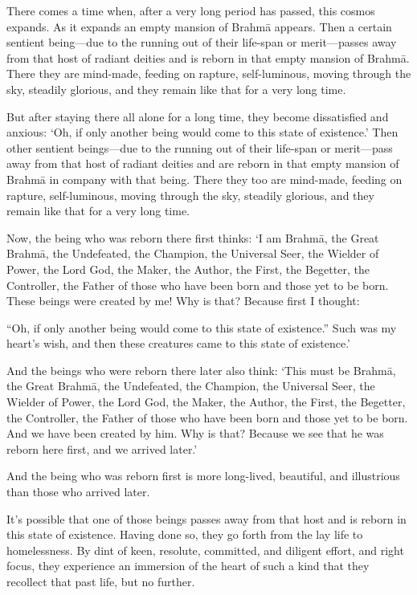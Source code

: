\documentclass[12pt,openany]{book}%
\begin{document}
There comes a time when, after a very long period has passed, this cosmos expands. As it expands an empty mansion of \textsanskrit{Brahmā} appears. Then a certain sentient being—due to the running out of their life-span or merit—passes away from that host of radiant deities and is reborn in that empty mansion of \textsanskrit{Brahmā}. There they are mind-made, feeding on rapture, self-luminous, moving through the sky, steadily glorious, and they remain like that for a very long time. 

But after staying there all alone for a long time, they become dissatisfied and anxious: ‘Oh, if only another being would come to this state of existence.’ Then other sentient beings—due to the running out of their life-span or merit—pass away from that host of radiant deities and are reborn in that empty mansion of \textsanskrit{Brahmā} in company with that being. There they too are mind-made, feeding on rapture, self-luminous, moving through the sky, steadily glorious, and they remain like that for a very long time. 

Now, the being who was reborn there first thinks: ‘I am \textsanskrit{Brahmā}, the Great \textsanskrit{Brahmā}, the Undefeated, the Champion, the Universal Seer, the Wielder of Power, the Lord God, the Maker, the Author, the First, the Begetter, the Controller, the Father of those who have been born and those yet to be born. These beings were created by me! Why is that? Because first I thought: 

“Oh, if only another being would come to this state of existence.” Such was my heart’s wish, and then these creatures came to this state of existence.’ 

And the beings who were reborn there later also think: ‘This must be \textsanskrit{Brahmā}, the Great \textsanskrit{Brahmā}, the Undefeated, the Champion, the Universal Seer, the Wielder of Power, the Lord God, the Maker, the Author, the First, the Begetter, the Controller, the Father of those who have been born and those yet to be born. And we have been created by him. Why is that? Because we see that he was reborn here first, and we arrived later.’ 

And the being who was reborn first is more long-lived, beautiful, and illustrious than those who arrived later. 

It’s possible that one of those beings passes away from that host and is reborn in this state of existence. Having done so, they go forth from the lay life to homelessness. By dint of keen, resolute, committed, and diligent effort, and right focus, they experience an immersion of the heart of such a kind that they recollect that past life, but no further. 
\end{document}
